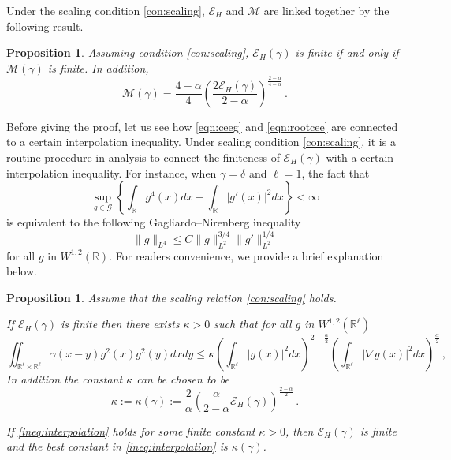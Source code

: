 \documentclass[12pt,reqno]{amsart}
\newtheorem{proposition}[theorem]{Proposition}
\theoremstyle{remark}
\newcommand{\1}{\mathbf{1}}
\def\RR{\mathbb{R}}
\def\cee{{\mathcal E}}
\def\cmm{{\mathcal M}}
\def\cff{{\mathcal F}}
\def\cgg{{\mathcal G}}
\def\lt{\left}
\def\rt{\right}
\begin{document}
		Under the scaling condition \ref{con:scaling}, $\cee_H$ and $\cmm$ are linked together by the following result. 
		\begin{proposition}\label{prop:ME} Assuming condition \ref{con:scaling}, $\cee_H(\gamma)$ is finite if and only if $\cmm(\gamma)$ is finite. In addition,
			\begin{equation*}
				\cmm(\gamma)=\frac{4- \alpha}4 \lt( \frac{2\cee_H(\gamma)}{2- \alpha} \rt)^{\frac{2- \alpha}{4- \alpha}}\,.
			\end{equation*}
		\end{proposition}
		Before giving the proof, let us see how \eqref{eqn:ceeg} and \eqref{eqn:rootcee} are connected to a certain interpolation inequality.
		Under scaling condition \ref{con:scaling}, it is a routine procedure in analysis to connect the finiteness of $\cee_H(\gamma)$ with a certain interpolation inequality. For instance, when $\gamma= \delta$ and $\ell=1$, the fact that
		\begin{equation*}
			\sup_{g\in\cgg}\lt\{\int_{\RR}g^4(x)dx-\int_\RR|g'(x)|^2dx \rt\}<\infty
		\end{equation*}
		is equivalent to the following Gagliardo--Nirenberg inequality
		\begin{equation*}
			\|g\|_{L^4}\le C\|g\|^{3/4}_{L^2}\|g'\|^{1/4}_{L^2}
		\end{equation*}
		for all $g$ in $W^{1,2}(\RR)$. For readers convenience, we provide a brief explanation below. %
		\begin{proposition}\label{prop:interpolation}
			Assume that the scaling relation \ref{con:scaling} holds. 
			
			 If $\cee_H(\gamma)$ is finite then there exists $\kappa>0$ such that for all $g$ in $W^{1,2}(\RR^\ell)$
			\begin{equation}\label{ineq:interpolation}
				\iint_{\RR^\ell\times\RR^\ell}\gamma(x-y)g^2(x)g^2(y)dxdy
				\le  \kappa \lt(\int_{\RR^\ell}|g(x) |^2dx \rt)^{2-\frac \alpha2} 
				\lt(\int_{\RR^\ell}|\nabla g(x) |^2dx \rt)^{\frac \alpha2} \,,
			\end{equation}
			In addition the constant $\kappa$ can be chosen to be
			\begin{equation}\label{id:bestkappa}
			 	\kappa:= \kappa(\gamma) :=\frac2 \alpha \lt(\frac{\alpha }{2- \alpha}\cee_H(\gamma) \rt)^{\frac{2- \alpha}{2}}\,.
			\end{equation} 
			

			 If \eqref{ineq:interpolation} holds for some finite constant $\kappa>0$, then $\cee_H(\gamma)$ is finite and the best constant in \eqref{ineq:interpolation} is $\kappa(\gamma)$.
		\end{proposition}
\end{document}
